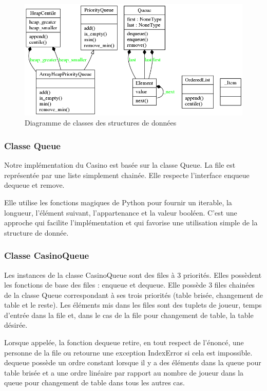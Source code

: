 \documentclass[french]{article}
\begin{document}
\begin{figure}
  \centering
  \includegraphics[resolution=130]{figures/diagramme-datastructures.png}
  \caption{Diagramme de classes des structures de données}
\end{figure}

\subsubsection{Classe \textsf{Queue}}
Notre implémentation du Casino est basée sur la classe Queue. La file est
représentée par une liste simplement chainée. Elle respecte l'interface
\textsf{enqueue} \textsf{dequeue} et \textsf{remove}. 

Elle utilise les fonctions magiques de Python pour fournir un iterable, la
longueur, l'élément suivant, l'appartenance et la valeur booléen. C'est une
approche qui facilite l'implémentation et qui favorise une utilisation simple de
la structure de donnée.

\subsubsection{Classe \textsf{CasinoQueue}}
Les instances de la classe CasinoQueue sont des files à 3 priorités. Elles
possèdent les fonctions de base des files : \textsf{enqueue} et
\textsf{dequeue}. Elle possède 3 files chainées de la classe Queue correspondant
à ses trois priorités (table brisée, changement de table et le reste). Les
éléments mis dans les files sont des tuplets de joueur, temps d'entrée dans la
file et, dans le cas de la file pour changement de table, la table désirée.

Lorsque appelée, la fonction dequeue retire, en tout respect de l'énoncé, une
personne de la file ou retourne une exception \textsf{IndexError} si cela est
impossible. \textsf{dequeue} possède un ordre constant lorsque il y a des éléments
dans la queue pour table brisée et a une ordre linéaire par rapport au nombre de
joueur dans la queue pour changement de table dans tous les autres cas.
\end{document}
